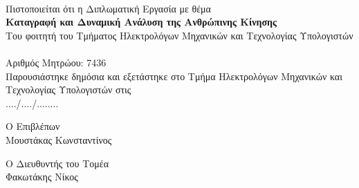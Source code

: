 \thispagestyle{empty}
\newpage

\thispagestyle{empty}
\clearpage\mbox{}\clearpage

\begin{center}
    {}\\[1cm]
    Πιστοποιείται ότι η Διπλωματική Εργασία με θέμα\\[0.5cm]
    \textbf{Καταγραφή και Δυναμική Ανάλυση της Ανθρώπινης Κίνησης}\\[1cm]
    Του φοιτητή του Τμήματος Ηλεκτρολόγων Μηχανικών και Τεχνολογίας Υπολογιστών\\[0.5cm]
    \\[10pt]
    Αριθμός Μητρώου: 7436\\[2cm]
    Παρουσιάστηκε δημόσια και εξετάστηκε στο Τμήμα Ηλεκτρολόγων Μηχανικών και Τεχνολογίας Υπολογιστών στις\\
    ..../..../........\\
\end{center}

\vfill

\begin{minipage}[t]{0.5\textwidth}
    \begin{flushleft}
        Ο Επιβλέπων\\
        Μουστάκας Κωνσταντίνος
    \end{flushleft}
\end{minipage}%
\begin{minipage}[t]{0.5\textwidth}
    \begin{flushright}
        Ο Διευθυντής του Τομέα\\
        Φακωτάκης Νίκος
    \end{flushright}
\end{minipage}%

\thispagestyle{empty}
\newpage
\clearpage\mbox{}
\thispagestyle{empty}
\clearpage

